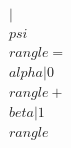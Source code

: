 \documentclass[preview]{standalone}
\begin{document}
\begin{align*}
|\\psi\\rangle = \\alpha|0\\rangle + \\beta|1\\rangle
\end{align*}
\end{document}
